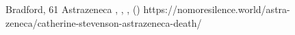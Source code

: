           {Bradford, }
          {61}
          {Astrazeneca}
          {}
          {
           ,
           ,
           ,
            ()}
          {https://nomoresilence.world/astra-zeneca/catherine-stevenson-astrazeneca-death/}

